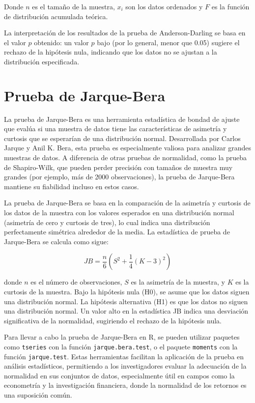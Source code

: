 \documentclass{article}
\begin{document}
Donde \(n\) es el tamaño de la muestra, \(x_i\) son los datos ordenados y \(F\) es la función de distribución acumulada teórica.

La interpretación de los resultados de la prueba de Anderson-Darling se basa en el valor \(p\) obtenido: un valor \(p\) bajo (por lo general, menor que 0.05) sugiere el rechazo de la hipótesis nula, indicando que los datos no se ajustan a la distribución especificada.

\section{Prueba de Jarque-Bera}

La prueba de Jarque-Bera es una herramienta estadística de bondad de ajuste que evalúa si una muestra de datos tiene las características de asimetría y curtosis que se esperarían de una distribución normal. Desarrollada por Carlos Jarque y Anil K. Bera, esta prueba es especialmente valiosa para analizar grandes muestras de datos. A diferencia de otras pruebas de normalidad, como la prueba de Shapiro-Wilk, que pueden perder precisión con tamaños de muestra muy grandes (por ejemplo, más de 2000 observaciones), la prueba de Jarque-Bera mantiene su fiabilidad incluso en estos casos.

La prueba de Jarque-Bera se basa en la comparación de la asimetría y curtosis de los datos de la muestra con los valores esperados en una distribución normal (asimetría de cero y curtosis de tres), lo cual indica una distribución perfectamente simétrica alrededor de la media. La estadística de prueba de Jarque-Bera se calcula como sigue:

\[JB = \frac{n}{6} \left(S^2 + \frac{1}{4}(K - 3)^2\right)\]

donde \(n\) es el número de observaciones, \(S\) es la asimetría de la muestra, y \(K\) es la curtosis de la muestra. Bajo la hipótesis nula (H0), se asume que los datos siguen una distribución normal. La hipótesis alternativa (H1) es que los datos no siguen una distribución normal. Un valor alto en la estadística JB indica una desviación significativa de la normalidad, sugiriendo el rechazo de la hipótesis nula.

Para llevar a cabo la prueba de Jarque-Bera en R, se pueden utilizar paquetes como \texttt{tseries} con la función \texttt{jarque.bera.test}, o el paquete \texttt{moments} con la función \texttt{jarque.test}. Estas herramientas facilitan la aplicación de la prueba en análisis estadísticos, permitiendo a los investigadores evaluar la adecuación de la normalidad en sus conjuntos de datos, especialmente útil en campos como la econometría y la investigación financiera, donde la normalidad de los retornos es una suposición común.
\end{document}
